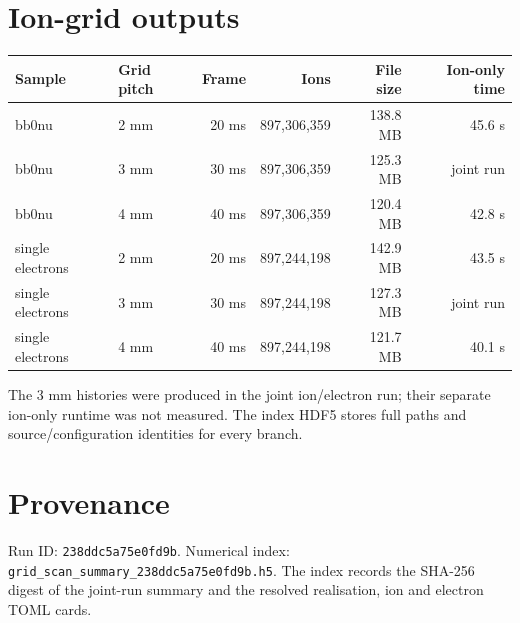 \documentclass[11pt]{article}
\begin{document}
\section*{Ion-grid outputs}
\begin{center}\begin{tabular}{llrrrr}\toprule
Sample & Grid pitch & Frame & Ions & File size & Ion-only time\\\midrule
bb0nu & 2 mm & 20 ms & 897,306,359 & 138.8 MB & 45.6 s\\
bb0nu & 3 mm & 30 ms & 897,306,359 & 125.3 MB & joint run\\
bb0nu & 4 mm & 40 ms & 897,306,359 & 120.4 MB & 42.8 s\\
single electrons & 2 mm & 20 ms & 897,244,198 & 142.9 MB & 43.5 s\\
single electrons & 3 mm & 30 ms & 897,244,198 & 127.3 MB & joint run\\
single electrons & 4 mm & 40 ms & 897,244,198 & 121.7 MB & 40.1 s\\
\bottomrule\end{tabular}\end{center}
The 3 mm histories were produced in the joint ion/electron run; their separate ion-only runtime was not measured. The index HDF5 stores full paths and source/configuration identities for every branch.
\section*{Provenance}
Run ID: \texttt{238ddc5a75e0fd9b}. Numerical index: \texttt{grid\_scan\_summary\_238ddc5a75e0fd9b.h5}. The index records the SHA-256 digest of the joint-run summary and the resolved realisation, ion and electron TOML cards.
\end{document}
